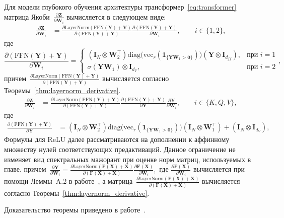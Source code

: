 \begin{theorem}\label{thm:transformer_derivative}
Для модели глубокого обучения архитектуры трансформер~\ref{eq:transformer} матрица Якоби~$\frac{\partial\mathbf{Z}}{\partial \mathbf{W}_i}$ вычисляется в следующем виде:
\begin{align}
    \frac{\partial\mathbf{Z}}{\partial \mathbf{W}_i} &= \frac{\partial \text{LayerNorm}(\text{FFN}(\mathbf{Y}) + \mathbf{Y})}{\partial (\text{FFN}(\mathbf{Y}) + \mathbf{Y})} \frac{\partial (\text{FFN}(\mathbf{Y}) + \mathbf{Y})}{\partial \mathbf{W}_i},\qquad i \in \{1,2\},
\end{align}
где
\begin{equation}
    \frac{\partial (\text{FFN}(\mathbf{Y}) + \mathbf{Y})}{\partial \mathbf{W}_i} = \begin{cases}
        \left(\mathbf{I}_{N} \otimes \mathbf{W}_2^\top \right) \mathrm{diag}\!\big(\mathrm{vec}_r(\mathbf{1}_{\{\mathbf{Y}\mathbf{W}_1>\mathbf{0}\}})\big) \left( \mathbf{Y} \otimes \mathbf{I}_{d_{ff}}\right), & \text{при } i = 1 \\
        \sigma(\mathbf{Y} \mathbf{W}_1) \otimes \mathbf{I}_{d_V}, & \text{при } i = 2
    \end{cases},
\end{equation}
причем~$\frac{\partial \text{LayerNorm}(\text{FFN}(\mathbf{Y}) + \mathbf{Y})}{\partial (\text{FFN}(\mathbf{Y}) + \mathbf{Y})}$ вычисляется согласно Теоремы~\ref{thm:layernorm_derivative}.
\begin{align}
    \frac{\partial\mathbf{Z}}{\partial \mathbf{W}_i} &= \frac{\partial \text{LayerNorm}(\text{FFN}(\mathbf{Y}) + \mathbf{Y})}{\partial (\text{FFN}(\mathbf{Y}) + \mathbf{Y})} \frac{\partial (\text{FFN}(\mathbf{Y}) + \mathbf{Y})}{\partial \mathbf{Y}} \frac{\partial \mathbf{Y}}{\partial \mathbf{W}_i}, \qquad i \in \{ K, Q, V\},
\end{align}
где
\begin{align}
    \frac{\partial (\text{FFN}(\mathbf{Y}) + \mathbf{Y})}{\partial \mathbf{Y}} &= \left( \mathbf{I}_{N} \otimes \mathbf{W}_2^\top\right) \mathrm{diag}\!\big(\mathrm{vec}_r(\mathbf{1}_{\{\mathbf{Y}\mathbf{W}_1>\mathbf{0}\}})\big) \left( \mathbf{I}_{N} \otimes \mathbf{W}_1^\top \right) + \left( \mathbf{I}_{N} \otimes \mathbf{I}_{d_V}\right),
\end{align}
Формулы для ReLU далее рассматриваются на дополнении к аффинному множеству нулей соответствующих предактиваций. Данное ограничение не изменяет вид спектральных мажорант при оценке норм матриц, используемых в главе.
причем~$\frac{\partial \mathbf{Y}}{\partial\mathbf{W}_i} = \frac{\partial \text{LayerNorm}(\mathbf{F} (\mathbf{X}) + \mathbf{X})}{\partial (\mathbf{F} (\mathbf{X}) + \mathbf{X})} \frac{\partial \mathbf{F}(\mathbf{X})}{\partial \mathbf{W}_i},$ где $\frac{\partial \mathbf{F}(\mathbf{X})}{\partial \mathbf{W}_i}$ вычисляется при помощи Леммы~A.2 в работе~\cite{noci2022signalpropagationtransformerstheoretical}, а матрица~$\frac{\partial \text{LayerNorm}(\mathbf{F} (\mathbf{X}) + \mathbf{X})}{\partial (\mathbf{F} (\mathbf{X}) + \mathbf{X})}$ вычисляется согласно Теоремы~\ref{thm:layernorm_derivative}.
\end{theorem}
Доказательство теоремы приведено в работе~\cite{petrov2025curvaturegap}.


